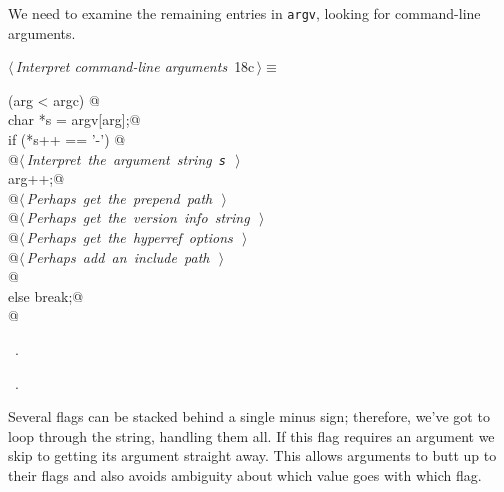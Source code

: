 \documentclass[a4paper]{report}
\begin{document}
We need to examine the remaining entries in \verb|argv|, looking for
command-line arguments.
\begin{flushleft} \small
\begin{minipage}{\linewidth}\label{scrap24}\raggedright\small
{} $\langle\,${\it Interpret command-line arguments}\nobreak\ {\footnotesize {18c}}$\,\rangle\equiv$
\vspace{-1ex}
\begin{list}{}{} \item
\mbox{}\verb@while (arg < argc) {@\\
\mbox{}\verb@  char *s = argv[arg];@\\
\mbox{}\verb@  if (*s++ == '-') {@\\
\mbox{}\verb@    @\hbox{$\langle\,${\it Interpret the argument string \verb|s|}\nobreak\ {\footnotesize {}}$\,\rangle$}\verb@@\\
\mbox{}\verb@    arg++;@\\
\mbox{}\verb@    @\hbox{$\langle\,${\it Perhaps get the prepend path}\nobreak\ {\footnotesize {}}$\,\rangle$}\verb@@\\
\mbox{}\verb@    @\hbox{$\langle\,${\it Perhaps get the version info string}\nobreak\ {\footnotesize {}}$\,\rangle$}\verb@@\\
\mbox{}\verb@    @\hbox{$\langle\,${\it Perhaps get the hyperref options}\nobreak\ {\footnotesize {}}$\,\rangle$}\verb@@\\
\mbox{}\verb@    @\hbox{$\langle\,${\it Perhaps add an include path}\nobreak\ {\footnotesize {}}$\,\rangle$}\verb@@\\
\mbox{}\verb@  }@\\
\mbox{}\verb@  else break;@\\
\mbox{}\verb@}@{\NWsep}
\end{list}
\vspace{-1.5ex}
\footnotesize
\begin{list}{}{\setlength{\itemsep}{-\parsep}\setlength{\itemindent}{-\leftmargin}}
\item \NWtxtMacroDefBy\ .
\item \NWtxtMacroRefIn\ .

\item{}
\end{list}
\end{minipage}\vspace{4ex}
\end{flushleft}
Several flags can be stacked behind a single minus sign; therefore,
we've got to loop through the string, handling them all.
If this flag requires an argument we skip to getting its argument
straight away. This allows arguments to butt up to their flags
and also avoids ambiguity about which value goes with which flag.
\end{document}
